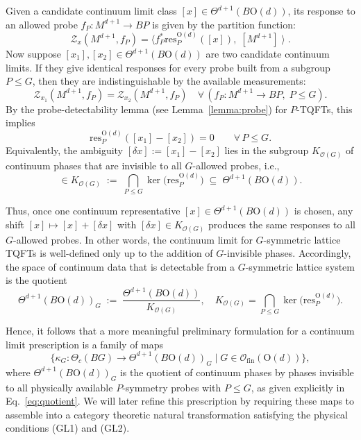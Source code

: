 \documentclass[aps,prx,reprint,superscriptaddress,twocolumn,amsmath,amssymb,amsfonts, nofootinbib]{revtex4-2}
\newcommand{\ofin}{\mathcal{O}_{\text{fin}}}
\newcommand{\res}{\text{res}}
\theoremstyle{apsstyle}
\begin{document}
Given a candidate continuum limit class $[x]\in \Theta^{d+1}(B\mathrm{O}(d))$, its response to an allowed probe $f_{P}: M^{d+1}\to BP$ is given by the partition function: 
\begin{equation*}
    \mathcal{Z}_{x}(M^{d+1}, f_{P})=\langle f_{P}^{*}\res^{\mathrm{O}(d)}_{P}([x]),\;[M^{d+1}]\;\rangle\;.
\end{equation*}
Now suppose $[x_{1}],[x_{2}]\in \Theta^{d+1}(B\mathrm{O}(d))$ are two candidate continuum limits. If they give identical responses for every probe built from a subgroup $P\le G$, then they are indistinguishable by the available measurements:
\begin{equation*}
    \mathcal{Z}_{x_{1}}(M^{d+1},f_{P})
    =
    \mathcal{Z}_{x_{2}}(M^{d+1},f_{P})
    \quad
    \forall\, (f_{P}:M^{d+1}\to BP,\; P\le G).
\end{equation*}
By the probe-detectability lemma (see Lemma~\ref{lemma:probe}) for $P$-TQFTs, this implies
\begin{equation*}
    \res^{\mathrm{O}(d)}_{P}([x_{1}]-[x_{2}])=0
    \qquad \forall\, P\le G.
\end{equation*}
Equivalently, the ambiguity $[\delta x]:=[x_{1}]-[x_{2}]$ lies in the subgroup $K_{\mathcal{O}(G)}$ of continuum phases that are invisible to all $G$-allowed probes, i.e.,
\begin{equation*}
    [\delta x] \in K_{\mathcal{O}(G)}
    \;:=\;
    \bigcap_{P\le G}\ker\bigl(\res^{\mathrm{O}(d)}_{P}\bigr)\;\subseteq\;\Theta^{d+1}(B\mathrm{O}(d)).
\end{equation*}

Thus, once one continuum representative $[x]\in\Theta^{d+1}(B\mathrm{O}(d))$ is chosen, any shift $[x]\mapsto [x]+[\delta x]$ with $[\delta x]\in K_{\mathcal{O}(G)}$ produces the same responses to all $G$-allowed probes. In other words, the continuum limit for $G$-symmetric lattice TQFTs is well-defined only up to the addition of $G$-invisible phases. Accordingly, the space of continuum data that is detectable from a $G$-symmetric lattice system is the quotient
\begin{equation}
    \Theta^{d+1}(B\mathrm{O}(d))_{G}\;:=\;\dfrac{\Theta^{d+1}(B\mathrm{O}(d))}{K_{\mathcal{O}(G)}},
    \quad K_{\mathcal{O}(G)} = \bigcap_{P\leq G}\ker\bigl(\res^{\mathrm{O}(d)}_{P}\bigr).
    \label{eq:quotient}
\end{equation}

\noindent Hence, it follows that a more meaningful preliminary formulation for a continuum limit prescription is a family of maps
\begin{equation}
    \{\kappa_{G}: \Theta_{c}(BG) \to \Theta^{d+1}(B\mathrm{O}(d))_{G}\;|\; G\in \ofin(\mathrm{O}(d))\},
    \label{eq:continuum_limit}
\end{equation}
where $\Theta^{d+1}(B\mathrm{O}(d))_{G}$ is the quotient of continuum phases by phases invisible to all physically available $P$-symmetry probes with $P\leq G$, as given explicitly in Eq.~\ref{eq:quotient}. We will later refine this prescription by requiring these maps to assemble into a category theoretic natural transformation satisfying the physical conditions {\rm(GL1)} and {\rm(GL2)}.
\end{document}
